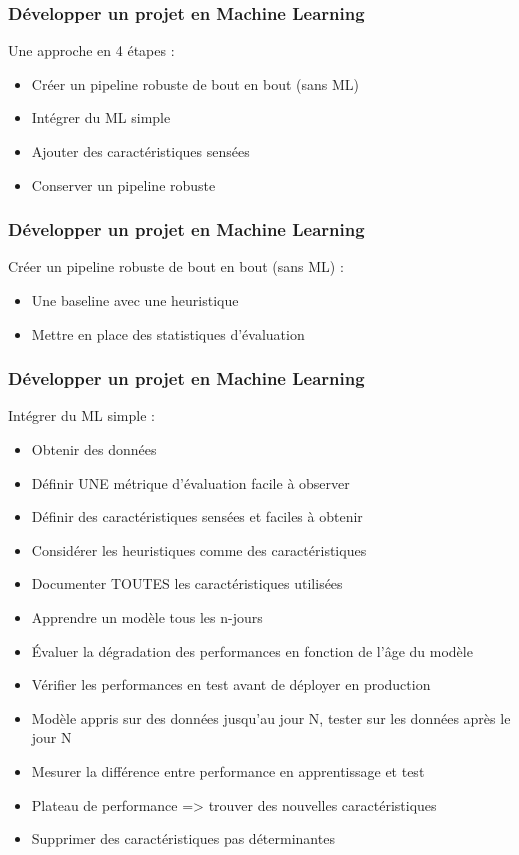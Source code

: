 \documentclass{formation}
\begin{document}
\begin{frame}
  \frametitle{Développer un projet en Machine Learning}
  Une approche en 4 étapes :
  \begin{itemize}
  \item Créer un pipeline robuste de bout en bout (sans ML)
  \item Intégrer du ML simple
  \item Ajouter des caractéristiques sensées
  \item Conserver un pipeline robuste
  \end{itemize}
\end{frame}

\begin{frame}
  \frametitle{Développer un projet en Machine Learning}
  Créer un pipeline robuste de bout en bout (sans ML) :
  \begin{itemize}
  \item Une baseline avec une heuristique
  \item Mettre en place des statistiques d'évaluation
  \end{itemize}
\end{frame}

\begin{frame}
  \frametitle{Développer un projet en Machine Learning}
  Intégrer du ML simple :
  \begin{itemize}
  \item Obtenir des données
  \item Définir UNE métrique d'évaluation facile à observer
  \item Définir des caractéristiques sensées et faciles à obtenir
  \item Considérer les heuristiques comme des caractéristiques
  \item Documenter TOUTES les caractéristiques utilisées
  \item Apprendre un modèle tous les n-jours
  \item Évaluer la dégradation des performances en fonction de l'âge du modèle
  \item Vérifier les performances en test avant de déployer en production
  \item Modèle appris sur des données jusqu'au jour N, tester sur les données après le jour N
  \item Mesurer la différence entre performance en apprentissage et test
  \item Plateau de performance => trouver des nouvelles caractéristiques
  \item Supprimer des caractéristiques pas déterminantes
  \end{itemize}
\end{frame}
\end{document}
